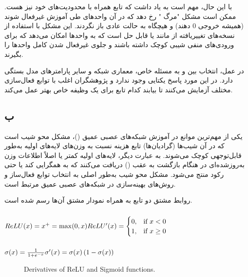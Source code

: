 \documentclass{article}
\begin{document}
با این حال، مهم است به یاد داشت که تابع  همراه با محدودیت‌های خود نیز هست. ممکن است مشکل "مرگ " رخ دهد که در آن واحدهای  طی آموزش غیرفعال شوند (همیشه خروجی 0 دهند) و هیچگاه به حالت عادی باز نگردند. این مشکل با استفاده از نسخه‌های تغییریافته از  مانند  یا  قابل حل است که به واحدها امکان می‌دهد که برای ورودی‌های منفی شیبی کوچک داشته باشند و جلوی غیرفعال شدن کامل واحدها را بگیرند.

در عمل، انتخاب بین  و  به مسئله خاص، معماری شبکه و سایر پارامترهای مدل بستگی دارد. در این مورد پاسخ یکتایی وجود ندارد و پژوهشگران اغلب با توابع فعال‌سازی مختلف آزمایش می‌کنند تا بیابند کدام تابع برای یک وظیفه خاص بهتر عمل می‌کند.

\subsection{ب}
یکی از مهم‌ترین موانع در آموزش شبکه‌های عصبی عمیق ()، مشکل محو شیب است که در آن شیب‌ها (گرادیان‌ها) تابع هزینه نسبت به وزن‌های لایه‌های اولیه به‌طور قابل‌توجهی کوچک می‌شوند. به عبارت دیگر، لایه‌های اولیه کمتر یا اصلاً اطلاعات وزن به‌روزشده‌ای در هنگام بازگشت به عقب () دریافت می‌کنند که به همگرایی کند یا حتی رکود منتج می‌شود. مشکل محو شیب به‌طور اصلی به انتخاب توابع فعال‌ساز و روش‌های بهینه‌سازی در شبکه‌های عصبی عمیق مرتبط است.

روابط مشتق دو تابع به همراه نمودار مشتق آن‌ها رسم شده است.

\begin{latin}
\subsubsection{}
$
ReLU(x) = x ^ + = \max(0, x)\\
ReLU'(x) =
\begin{cases}
0, & \text{if } x < 0 \\
1, & \text{if } x \geq 0
\end{cases}
$
\subsubsection{}
$
\sigma(x) = \frac{1}{1 + e ^ {-x}} \\
\sigma'(x) = \sigma(x) \left( 1 - \sigma(x) \right)
$
\begin{figure}[htbp]
\centering
{}
\caption{Derivatives of ReLU and Sigmoid functions.}
\end{figure}
\end{latin}
\end{document}
